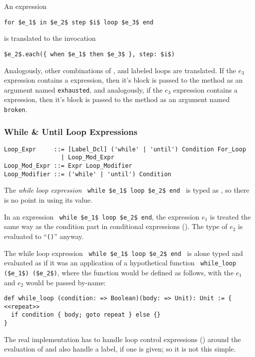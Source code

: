 An expression 
\begin{lstlisting}
for $e_1$ in $e_2$ step $i$ loop $e_3$ end
\end{lstlisting} 
is translated to the invocation
\begin{lstlisting}[deletekeywords={step}]
$e_2$.each({ when $e_1$ then $e_3$ }, step: $i$)
\end{lstlisting} 

Analogously, other combinations of ,  and labeled loops are translated. If the $e_3$ expression contains a  expression, then it's block is passed to the  method as an argument named \lstinline[deletekeywords={exhausted}]{exhausted}, and analogously, if the $e_3$ expression contains a  expression, then it's block is passed to the  method as an argument named \lstinline[deletekeywords={broken}]{broken}.







\subsubsection{While \& Until Loop Expressions}

\syntax\begin{lstlisting}
Loop_Expr     ::= [Label_Dcl] ('while' | 'until') Condition For_Loop
                | Loop_Mod_Expr
Loop_Mod_Expr ::= Expr Loop_Modifier
Loop_Modifier ::= ('while' | 'until') Condition
\end{lstlisting}

The {\em while loop expression} ~\lstinline!while $e_1$ loop $e_2$ end!~ is typed as , so there is no point in using its value. 

In an expression ~\lstinline!while $e_1$ loop $e_2$ end!, the expression $e_1$ is treated the same way as the condition part in conditional expressions (). The type of $e_2$ is evaluated to ``\lstinline!()!'' anyway.

The while loop expression ~\lstinline!while $e_1$ loop $e_2$ end!~ is alone typed and evaluated as if it was an application of a hypothetical function ~\lstinline!while_loop ($e_1$) ($e_2$)!, where the function  would be defined as follows, with the $e_1$ and $e_2$ would be passed by-name: 
\begin{lstlisting}
def while_loop (condition: => Boolean)(body: => Unit): Unit := {
<<repeat>>
  if condition { body; goto repeat } else {}
}
\end{lstlisting}
The real implementation has to handle loop control expressions () around the evaluation of  and also handle a label, if one is given; so it is not this simple. 

